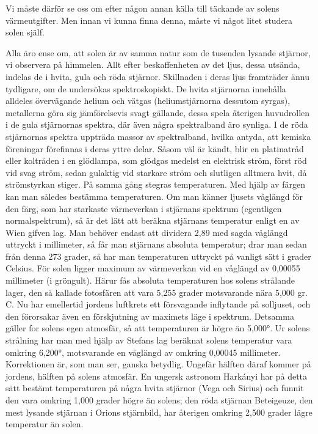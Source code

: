 \documentclass[a4paper, 12pt, oneside, swedish]{article}
\begin{document}
Vi måste därför se oss om efter någon annan källa till täckande av solens värmeutgifter. Men innan vi kunna finna denna, måste vi något litet studera solen själf.

Alla äro ense om, att solen är av samma natur som de tusenden lysande stjärnor, vi observera på himmelen. Allt efter beskaffenheten av det ljus, dessa utsända, indelas de i hvita, gula och röda stjärnor. Skillnaden i deras ljus framträder ännu tydligare, om de undersökas spektroskopiskt. De hvita stjärnorna innehålla alldeles övervägande helium och vätgas (heliumstjärnorna dessutom syrgas), metallerna göra sig jämförelsevis svagt gällande, dessa spela återigen huvudrollen i de gula stjärnornas spektra, där även några spektralband äro synliga. I de röda stjärnornas spektra uppträda massor av spektralband, hvilka antyda, att kemiska föreningar förefinnas i deras yttre delar. Såsom väl är kändt, blir en platinatråd eller koltråden i en glödlampa, som glödgas medelst en elektrisk ström, först röd vid svag ström, sedan gulaktig vid starkare ström och slutligen alltmera hvit, då strömstyrkan stiger. På samma gång stegras temperaturen. Med hjälp av färgen kan man således bestämma temperaturen. Om man känner ljusets våglängd för den färg, som har starkaste värmeverkan i stjärnans spektrum (egentligen normalspektrum), så är det lätt att beräkna stjärnans temperatur enligt en av Wien gifven lag. Man behöver endast att dividera 2,89 med sagda våglängd uttryckt i millimeter, så får man stjärnans absoluta temperatur; drar man sedan från denna 273 grader, så har man temperaturen uttryckt på vanligt sätt i grader Celsius. För solen ligger maximum av värmeverkan vid en våglängd av 0,00055 millimeter (i gröngult). Härur fås absoluta temperaturen hos solens strålande lager, den så kallade fotosfären att vara 5,255 grader motsvarande nära 5,000 gr. C. Nu har emellertid jordens luftkrets ett försvagande inflytande på solljuset, och den förorsakar även en förskjutning av maximets läge i spektrum. Detsamma gäller for solens egen atmosfär, så att temperaturen är högre än 5,000°. Ur solens strålning har man med hjälp av Stefans lag beräknat solens temperatur vara omkring 6,200°, motsvarande en våglängd av omkring 0,00045 millimeter. Korrektionen är, som man ser, ganska betydlig. Ungefär hälften däraf kommer på jordens, hälften på solens atmosfär. En ungersk astronom Harkányi har på detta sätt bestämt temperaturen på några hvita stjärnor (Vega och Sirius) och funnit den vara omkring 1,000 grader högre än solens; den röda stjärnan Beteigeuze, den mest lysande stjärnan i Orions stjärnbild, har återigen omkring 2,500 grader lägre temperatur än solen.
\end{document}
